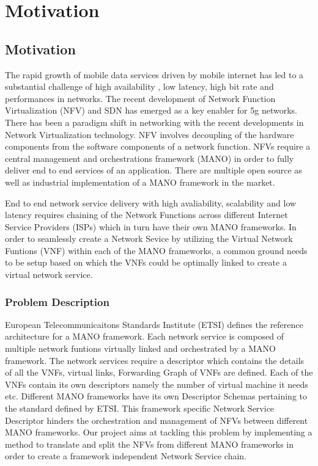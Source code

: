 \chapter{Motivation}
\label{ch:Motivation}

\section{Motivation}

The rapid growth of mobile data services driven by mobile internet has led to a substantial challenge of high availability , low latency, high bit rate and performances in networks. The recent development of Network Function Virtualization (NFV) and SDN has emerged as a key enabler for 5g networks. 
There has been a paradigm shift in networking with the recent developments in Network Virtualization technology. NFV involves decoupling of the hardware components from the software components of a network function. NFVs require a central management and orchestrations framework (MANO) in order to fully deliver end to end services of an application. There are multiple open source as well as industrial implementation of a  MANO framework in the market. 

End to end network service delivery with high avaliability, scalability and low latency requires chaining of the Network Functions across different Internet Service Providers (ISPs) which in turn have their own MANO frameworks. In order to seamlessly create a Network Sevice by utilizing the Virtual Network Funtions (VNF) within each of the MANO frameworks, a common ground needs to be setup based on which the VNFs could be optimally linked to create a virtual network service.


\subsection{Problem Description}

European Telecommunicaitons Standards Institute (ETSI) defines the reference architecture for a MANO framework. Each network service is composed of multiple network funtions virtually linked and orchestrated by a MANO framework. The network services require a descriptor which contains the details of all the VNFs, virtual links, Forwarding Graph of VNFs are defined. Each of the VNFs contain its own descriptors namely the number of virtual machine it needs etc. Different MANO frameworks have its own Descriptor Schemas pertaining to the standard defined by ETSI. This framework specific Network Service Descriptor hinders the orchestration and management of NFVs between different MANO frameworks. Our project aims at tackling this problem by implementing a method to translate and split the NFVs from different MANO frameworks in order to create a framework independent Network Service chain.
